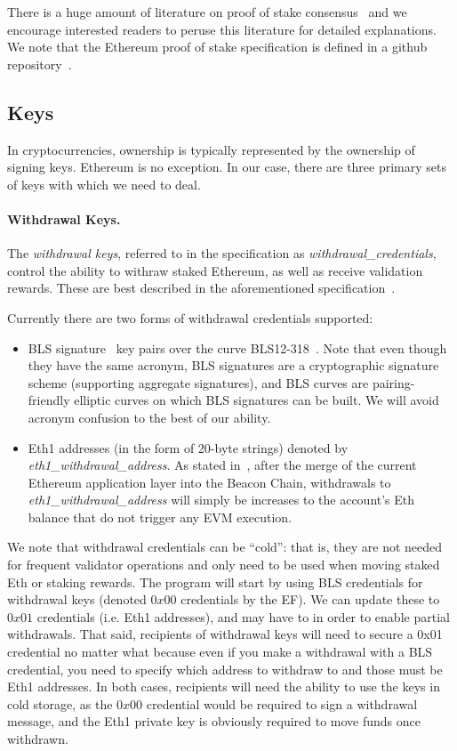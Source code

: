 There is a huge amount of literature on proof of stake consensus~\cite{buterin2017casper,C:KRDO17,FC:DaiPasShi19} and we encourage interested readers to peruse this literature for detailed explanations.  We note that the Ethereum proof of stake specification is defined in a github repository~\cite{EthVal}.

\subsection{Keys}
In cryptocurrencies, ownership is typically represented by the ownership of signing keys.  Ethereum is no exception.  In our case, there are three primary sets of keys with which we need to deal.

\paragraph{Withdrawal Keys.}  The \emph{withdrawal keys}, referred to in the specification as \emph{withdrawal\_credentials}, control the ability to withraw staked Ethereum, as well as receive validation rewards.  These are best described in the aforementioned specification~\cite{EthVal}.

Currently there are two forms of withdrawal credentials supported:
\begin{itemize}
\item BLS signature~\cite{AC:BonLynSha01} key pairs over the curve BLS12-318~\cite{barreto2002constructing,BLS12-318}.  Note that even though they have the same acronym, BLS signatures are a cryptographic signature scheme (supporting aggregate signatures), and BLS curves are pairing-friendly elliptic curves on which BLS signatures can be built.  We will avoid acronym confusion to the best of our ability.
\item Eth1 addresses (in the form of 20-byte strings) denoted by \emph{eth1\_withdrawal\_address}.  As stated in~\cite{EthVal}, after the merge of the current Ethereum application layer into the Beacon Chain, withdrawals to \emph{eth1\_withdrawal\_address} will simply be increases to the account's Eth balance that do not trigger any EVM execution.
\end{itemize}

We note that withdrawal credentials can be ``cold'':  that is, they are not needed for frequent validator operations and only need to be used when moving staked Eth or staking rewards.  The program will start by using BLS credentials for withdrawal keys (denoted $0x00$ credentials by the EF). We can update these to $0x01$ credentials (i.e. Eth1 addresses), and may have to in order to enable partial withdrawals. That said, recipients of withdrawal keys will need to secure a 0x01 credential no matter what because even if you make a withdrawal with a BLS credential, you need to specify which address to withdraw to and those must be Eth1 addresses. In both cases, recipients will need the ability to use the keys in cold storage, as the $0x00$ credential would be required to sign a withdrawal message, and the Eth1 private key is obviously required to move funds once withdrawn. 

